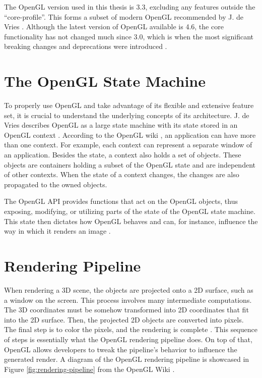 \documentclass[
  digital,     %
  oneside,     %
  nosansbold,  %
  nocolorbold, %
  lof,         %
  lot,         %
]{fithesis4}
\begin{document}
The OpenGL version used in this thesis is 3.3, excluding any features outside the \enquote{core-profile}.
This forms a subset of modern OpenGL recommended by J. de Vries \cite{learnopengl}.
Although the latest version of OpenGL available is 4.6, the core functionality has not changed
much since 3.0, which is when the most significant breaking changes and deprecations
were introduced \cite{openglwiki-context}.

\section{The OpenGL State Machine}
To properly use OpenGL and take advantage of its flexible and extensive feature set, it is crucial to
understand the underlying concepts of its architecture. J. de Vries describes OpenGL as a large state
machine with its state stored in an OpenGL context \cite{learnopengl}. According to the OpenGL wiki \cite{openglwiki-context},
an application can have more than one context. For example, each context can represent a separate window of an
application. Besides the state, a context also holds a set of objects. These objects are containers
holding a subset of the OpenGL state and are independent of other contexts. When the state of
a context changes, the changes are also propagated to the owned objects.

The OpenGL API provides functions that act on the OpenGL objects, thus exposing, modifying, or
utilizing parts of the state of the OpenGL state machine. This state then dictates how OpenGL
behaves and can, for instance, influence the way in which it renders an image \cite{openglwiki-statemachine}.

\section{Rendering Pipeline}
When rendering a 3D scene, the objects are projected onto a 2D surface, such as a window on the
screen. This process involves many intermediate computations. The 3D coordinates must be
somehow transformed into 2D coordinates that fit into the 2D surface. Then, the projected 2D
objects are converted into pixels. The final step is to color the pixels,
and the rendering is complete \cite{learnopengl-triangle}.
This sequence of steps is essentially what the OpenGL rendering pipeline does.
On top of that, OpenGL allows developers to tweak the pipeline's behavior to influence the generated render.
A diagram of the OpenGL rendering pipeline is showcased in Figure \ref{fig:rendering-pipeline} from
the OpenGL Wiki \cite{openglwiki-rendering-pipeline}.
\end{document}
